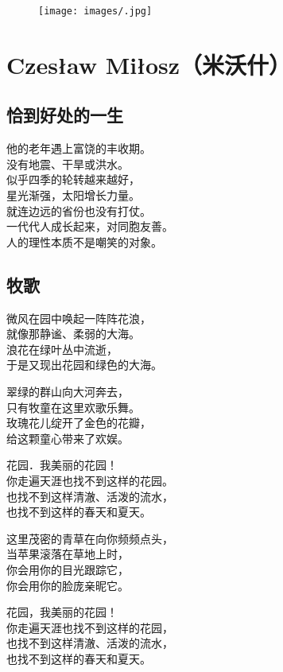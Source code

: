 \documentclass[]{book}
\renewenvironment{quote}{\begin{VF}}{\end{VF}}
\begin{document}
\begin{figure}[htbp]
\centering
\texttt{[image: images/.jpg]}
\caption{}
\end{figure}

\chapter{Czesław Miłosz（米沃什）}\label{czesaw-miosz}

\section{恰到好处的一生}

\begin{quote}
他的老年遇上富饶的丰收期。\\
没有地震、干旱或洪水。\\
似乎四季的轮转越来越好，\\
星光渐强，太阳增长力量。\\
就连边远的省份也没有打仗。\\
一代代人成长起来，对同胞友善。\\
人的理性本质不是嘲笑的对象。
\end{quote}

\section{牧歌}

\begin{quote}
微风在园中唤起一阵阵花浪，\\
就像那静谧、柔弱的大海。\\
浪花在绿叶丛中流逝，\\
于是又现出花园和绿色的大海。

翠绿的群山向大河奔去，\\
只有牧童在这里欢歌乐舞。\\
玫瑰花儿绽开了金色的花瓣，\\
给这颗童心带来了欢娱。

花园．我美丽的花园！\\
你走遍天涯也找不到这样的花园。\\
也找不到这样清澈、活泼的流水，\\
也找不到这样的春天和夏天。

这里茂密的青草在向你频频点头，\\
当苹果滚落在草地上时，\\
你会用你的目光跟踪它，\\
你会用你的脸庞亲昵它。

花园，我美丽的花园！\\
你走遍天涯也找不到这样的花园，\\
也找不到这样清澈、活泼的流水，\\
也找不到这样的春天和夏天。
\end{quote}
\end{document}
